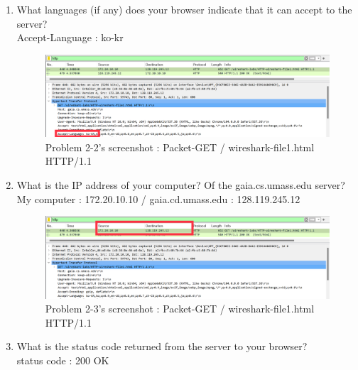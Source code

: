 \begin{enumerate}[label=\bfseries Problem \arabic*:,leftmargin=*,labelindent=1em]
            
            
        \item What languages (if any) does your browser indicate that it can accept to the server?\\[0.2mm]
            \soln Accept-Language : ko-kr
            \vspace{-2mm}  
            \begin{figure}[!h]\centering
        		\includegraphics[width=.78\textwidth]{image/result_week01/Q2-2.png}
        		\caption{\footnotesize Problem 2-2's screenshot : Packet-GET / wireshark-file1.html HTTP/1.1}
        		\vspace{-10pt}
            \end{figure}
        \item What is the IP address of your computer? Of the gaia.cs.umass.edu server? \\[0.2mm]
            \soln My computer : 172.20.10.10 / gaia.cd.umass.edu : 128.119.245.12
            \vspace{-2mm}  
            \begin{figure}[!h]\centering
        		\includegraphics[width=.78\textwidth]{image/result_week01/Q2-3.png}
        		\caption{\footnotesize Problem 2-3's screenshot : Packet-GET / wireshark-file1.html HTTP/1.1}
        		\vspace{-10pt}
            \end{figure}
\newpage
        \item What is the status code returned from the server to your browser?\\[0.2mm]
            \soln status code : 200 OK
            \vspace{-2mm}  
            \begin{figure}[!h]\centering

\end{figure}
\end{enumerate}

